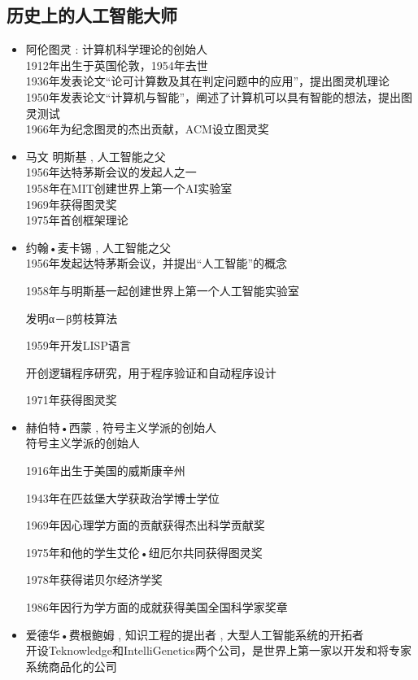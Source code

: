 \documentclass[UTF8,a4paper]{ctexart}
\begin{document}
\subsection{历史上的人工智能大师}
\begin{itemize}
	\item 阿伦图灵 : 计算机科学理论的创始人\\
	      1912年出生于英国伦敦，1954年去世\\
	      1936年发表论文“论可计算数及其在判定问题中的应用”，提出图灵机理论\\
	      1950年发表论文“计算机与智能”，阐述了计算机可以具有智能的想法，提出图灵测试\\
	      1966年为纪念图灵的杰出贡献，ACM设立图灵奖

	\item 马文 明斯基 , 人工智能之父\\
	      1956年达特茅斯会议的发起人之一\\
	      1958年在MIT创建世界上第一个AI实验室\\
	      1969年获得图灵奖\\
	      1975年首创框架理论
	\item 约翰•麦卡锡 , 人工智能之父\\
	      1956年发起达特茅斯会议，并提出“人工智能”的概念

	      1958年与明斯基一起创建世界上第一个人工智能实验室

	      发明α－β剪枝算法

	      1959年开发LISP语言

	      开创逻辑程序研究，用于程序验证和自动程序设计

	      1971年获得图灵奖

	\item 赫伯特•西蒙 , 符号主义学派的创始人 \\
	      符号主义学派的创始人

	      1916年出生于美国的威斯康辛州


	      1943年在匹兹堡大学获政治学博士学位

	      1969年因心理学方面的贡献获得杰出科学贡献奖

	      1975年和他的学生艾伦•纽厄尔共同获得图灵奖

	      1978年获得诺贝尔经济学奖

	      1986年因行为学方面的成就获得美国全国科学家奖章


	\item 爱德华•费根鲍姆 , 知识工程的提出者 ,	大型人工智能系统的开拓者\\
	      开设Teknowledge和IntelliGenetics两个公司，是世界上第一家以开发和将专家系统商品化的公司
\end{itemize}
\end{document}
